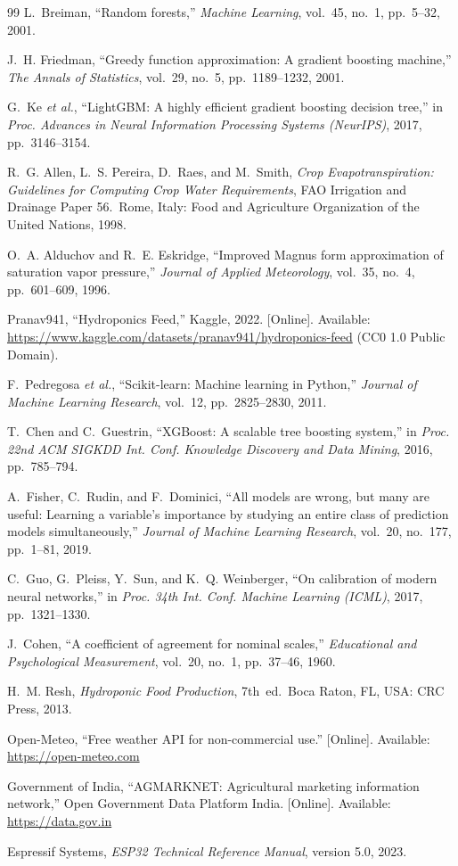 \documentclass[conference]{IEEEtran}
\begin{document}
\begin{thebibliography}{99}
L.~Breiman, ``Random forests,'' \emph{Machine Learning}, vol.~45, no.~1,
pp.~5--32, 2001.

J.~H. Friedman, ``Greedy function approximation: A gradient boosting machine,''
\emph{The Annals of Statistics}, vol.~29, no.~5, pp.~1189--1232, 2001.

G.~Ke \emph{et al.}, ``LightGBM: A highly efficient gradient boosting decision
tree,'' in \emph{Proc. Advances in Neural Information Processing Systems
(NeurIPS)}, 2017, pp.~3146--3154.

R.~G. Allen, L.~S. Pereira, D.~Raes, and M.~Smith, \emph{Crop
Evapotranspiration: Guidelines for Computing Crop Water Requirements}, FAO
Irrigation and Drainage Paper 56.\ Rome, Italy: Food and Agriculture
Organization of the United Nations, 1998.

O.~A. Alduchov and R.~E. Eskridge, ``Improved Magnus form approximation of
saturation vapor pressure,'' \emph{Journal of Applied Meteorology}, vol.~35,
no.~4, pp.~601--609, 1996.

Pranav941, ``Hydroponics Feed,'' Kaggle, 2022. [Online]. Available:
\url{https://www.kaggle.com/datasets/pranav941/hydroponics-feed} (CC0 1.0 Public
Domain).

F.~Pedregosa \emph{et al.}, ``Scikit-learn: Machine learning in Python,''
\emph{Journal of Machine Learning Research}, vol.~12, pp.~2825--2830, 2011.

T.~Chen and C.~Guestrin, ``XGBoost: A scalable tree boosting system,'' in
\emph{Proc. 22nd ACM SIGKDD Int. Conf. Knowledge Discovery and Data Mining},
2016, pp.~785--794.

A.~Fisher, C.~Rudin, and F.~Dominici, ``All models are wrong, but many are
useful: Learning a variable's importance by studying an entire class of
prediction models simultaneously,'' \emph{Journal of Machine Learning Research},
vol.~20, no.~177, pp.~1--81, 2019.

C.~Guo, G.~Pleiss, Y.~Sun, and K.~Q. Weinberger, ``On calibration of modern
neural networks,'' in \emph{Proc. 34th Int. Conf. Machine Learning (ICML)},
2017, pp.~1321--1330.

J.~Cohen, ``A coefficient of agreement for nominal scales,'' \emph{Educational
and Psychological Measurement}, vol.~20, no.~1, pp.~37--46, 1960.

H.~M. Resh, \emph{Hydroponic Food Production}, 7th~ed.\ Boca Raton, FL, USA: CRC
Press, 2013.

Open-Meteo, ``Free weather API for non-commercial use.'' [Online]. Available:
\url{https://open-meteo.com}

Government of India, ``AGMARKNET: Agricultural marketing information network,''
Open Government Data Platform India. [Online]. Available:
\url{https://data.gov.in}

Espressif Systems, \emph{ESP32 Technical Reference Manual}, version 5.0, 2023.
\end{thebibliography}
\end{document}
